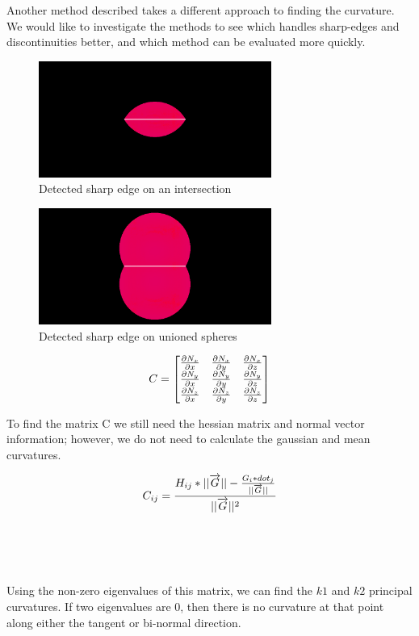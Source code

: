 \documentclass[conference]{acmsiggraph}
\begin{document}
Another method described\cite{DeAraujo2004} takes a different approach to
finding the curvature. We would like to investigate the methods to see which
handles sharp-edges and discontinuities better, and which method can be
evaluated more quickly.

\begin{figure}[htbp]
	\centering
	\includegraphics[height=1.5in]{images/intersect_sharp.png}
	\caption{Detected sharp edge on an intersection}
	\label{fig:IntersectSharpEdge}
\end{figure}

\begin{figure}[htbp]
	\includegraphics[height=1.5in]{images/union_sharp.png}
	\caption{Detected sharp edge on unioned spheres}
	\label{fig:UnionSharpEdge}
\end{figure}

$$
C=
\begin{bmatrix}
	{\partial N_x \over \partial x}&{\partial N_x \over \partial y}&{\partial N_x \over \partial z}\\
	{\partial N_y \over \partial x}&{\partial N_y \over \partial y}&{\partial N_y \over \partial z}\\
	{\partial N_z \over \partial x}&{\partial N_z \over \partial y}&{\partial N_z \over \partial z}
\end{bmatrix}
$$

To find the matrix C we still need the hessian matrix and normal vector
information; however, we do not need to calculate the gaussian and mean
curvatures.

$$
C_{ij} = {H_{ij} * ||\overrightarrow{G}|| - {G_i * dot_j \over
	||\overrightarrow{G}||} \over ||\overrightarrow{G}||^2}
$$\\\\\\\\
Using the non-zero eigenvalues of this matrix, we can find the $k1$ and $k2$
principal curvatures. If two eigenvalues are 0, then there is no curvature at
that point along either the tangent or bi-normal direction.
\end{document}

